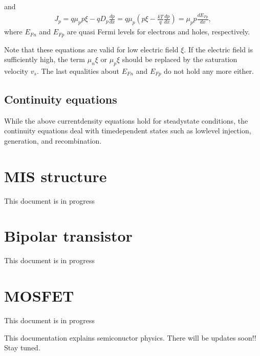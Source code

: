 \documentclass[letterpaper,10pt,english]{sphinxmanual}
\begin{document}
\sphinxAtStartPar
and
\begin{equation}\label{equation:Basic_equation:hole_current_quasi_fermi}
\begin{split}J_p = q\mu_pp\xi - qD_p\frac{dp}{dx} = q\mu_p\left(p\xi - \frac{kT}{q}\frac{dp}{dx}\right) = \mu_pp\frac{dE_{Fp}}{dx},\end{split}
\end{equation}
\sphinxAtStartPar
where \(E_{Fn}\) and \(E_{Fp}\) are quasi Fermi levels for electrons and holes, respectively.

\sphinxAtStartPar
Note that these equations are valid for low electric field \(\xi\).
If the electric field is sufficiently high, the term \(\mu_n\xi\) or \(\mu_p\xi\) should be replaced by the saturation velocity \(v_s\).
The last equalities about \(E_{Fn}\) and \(E_{Fp}\) do not hold any more either.


\subsection{Continuity equations}
\label{\detokenize{Basic_equation:continuity-equations}}
\sphinxAtStartPar
While the above current\sphinxhyphen{}density equations hold for steady\sphinxhyphen{}state conditions, the continuity equations deal with time\sphinxhyphen{}dependent states such as low\sphinxhyphen{}level injection, generation, and recombination.

\sphinxstepscope


\section{MIS structure}
\label{\detokenize{MIS_structure:mis-structure}}\label{\detokenize{MIS_structure::doc}}
\sphinxAtStartPar
This document is in progress

\sphinxstepscope


\section{Bipolar transistor}
\label{\detokenize{Bipolar_transistor:bipolar-transistor}}\label{\detokenize{Bipolar_transistor::doc}}
\sphinxAtStartPar
This document is in progress

\sphinxstepscope


\section{MOSFET}
\label{\detokenize{MOSFET:mosfet}}\label{\detokenize{MOSFET::doc}}
\sphinxAtStartPar
This document is in progress

\sphinxAtStartPar
This documentation explains semiconuctor physics.
There will be updates soon!!
Stay tuned.

\sphinxAtStartPar
{}



\renewcommand{\indexname}{Index}
\printindex
\end{document}
